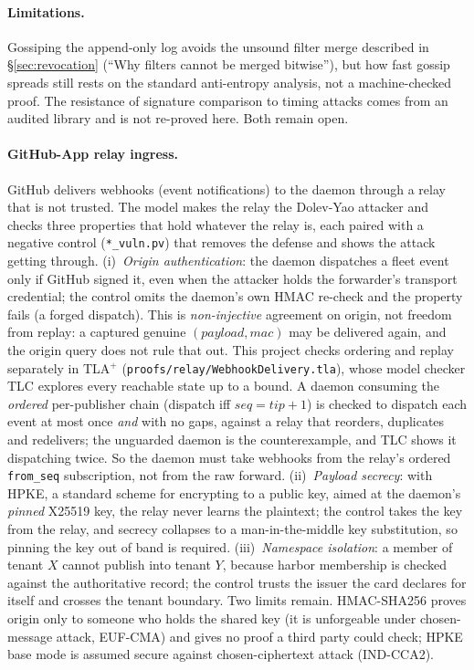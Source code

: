\documentclass[11pt,a4paper]{article}
\theoremstyle{definition}
\begin{document}
\paragraph{Limitations.} Gossiping the append-only log avoids the unsound filter merge described in \S\ref{sec:revocation} (``Why filters cannot be merged bitwise''), but how fast gossip spreads still rests on the standard anti-entropy analysis, not a machine-checked proof. The resistance of signature comparison to timing attacks comes from an audited library and is not re-proved here. Both remain open.

\paragraph{GitHub-App relay ingress.}
GitHub delivers webhooks (event notifications) to the daemon through a relay that is not trusted. The model makes the relay the Dolev-Yao attacker and checks three properties that hold whatever the relay is, each paired with a negative control (\texttt{*\_vuln.pv}) that removes the defense and shows the attack getting through. (i)~\emph{Origin authentication}: the daemon dispatches a fleet event only if GitHub signed it, even when the attacker holds the forwarder's transport credential; the control omits the daemon's own HMAC re-check and the property fails (a forged dispatch). This is \emph{non-injective} agreement on origin, not freedom from replay: a captured genuine $(\textit{payload},\textit{mac})$ may be delivered again, and the origin query does not rule that out. This project checks ordering and replay separately in TLA$^{+}$ (\texttt{proofs/relay/WebhookDelivery.tla}), whose model checker TLC explores every reachable state up to a bound. A daemon consuming the \emph{ordered} per-publisher chain (dispatch iff $\textit{seq}=\textit{tip}+1$) is checked to dispatch each event at most once \emph{and} with no gaps, against a relay that reorders, duplicates and redelivers; the unguarded daemon is the counterexample, and TLC shows it dispatching twice. So the daemon must take webhooks from the relay's ordered \texttt{from\_seq} subscription, not from the raw forward. (ii)~\emph{Payload secrecy}: with HPKE, a standard scheme for encrypting to a public key, aimed at the daemon's \emph{pinned} X25519 key, the relay never learns the plaintext; the control takes the key from the relay, and secrecy collapses to a man-in-the-middle key substitution, so pinning the key out of band is required. (iii)~\emph{Namespace isolation}: a member of tenant $X$ cannot publish into tenant $Y$, because harbor membership is checked against the authoritative record; the control trusts the issuer the card declares for itself and crosses the tenant boundary. Two limits remain. HMAC-SHA256 proves origin only to someone who holds the shared key (it is unforgeable under chosen-message attack, EUF-CMA) and gives no proof a third party could check; HPKE base mode is assumed secure against chosen-ciphertext attack (IND-CCA2).
\end{document}
